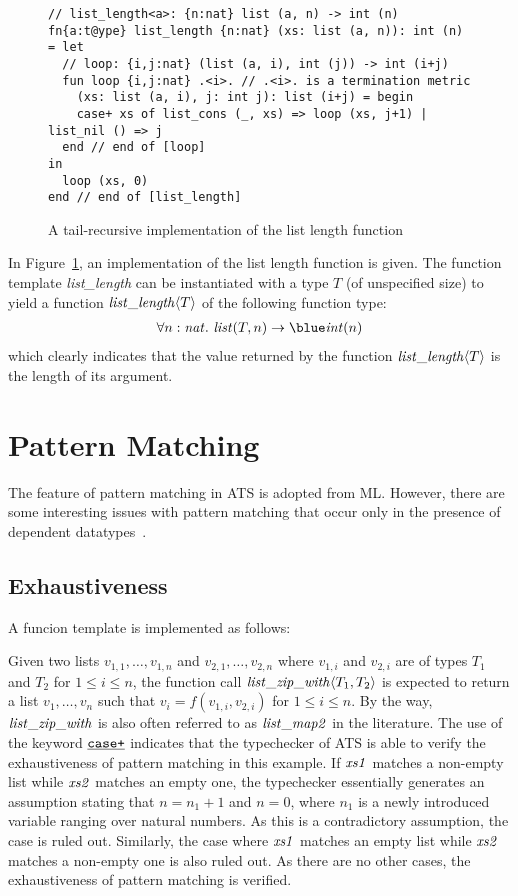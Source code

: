 \begin{figure}[thp]
\begin{verbatim}
// list_length<a>: {n:nat} list (a, n) -> int (n)
fn{a:t@ype} list_length {n:nat} (xs: list (a, n)): int (n) = let
  // loop: {i,j:nat} (list (a, i), int (j)) -> int (i+j)
  fun loop {i,j:nat} .<i>. // .<i>. is a termination metric
    (xs: list (a, i), j: int j): list (i+j) = begin
    case+ xs of list_cons (_, xs) => loop (xs, j+1) | list_nil () => j
  end // end of [loop]
in
  loop (xs, 0)
end // end of [list_length]
\end{verbatim}
\caption{A tail-recursive implementation of the list length function}
\label{figure:list_length_function}
\end{figure}
In Figure~\ref{figure:list_length_function}, an implementation of the list
length function is given. The function template {\it list\_length} can be
instantiated with a type $T$ (of unspecified size) to yield a function
${\it list\_length}\langle T\rangle$ of the following function type:
\[\begin{array}{l}
\forall n:\snat.~\tlist(T, n)\timp \tint(n) \\
\end{array}\]
which clearly indicates that the value returned by the function
${\it list\_length}\langle T\rangle$ is the length of its argument.

\section{Pattern Matching}
The feature of pattern matching in ATS is adopted from ML. However,
there are some interesting issues with pattern matching that occur
only in the presence of dependent datatypes~\cite{DTPM-jucs03}.

\subsection{Exhaustiveness}
A funcion template is implemented as follows:

Given two lists $v_{1,1},\ldots, v_{1,n}$ and $v_{2,1},\ldots, v_{2,n}$
where $v_{1,i}$ and $v_{2,i}$ are of types $T_1$ and $T_2$ for $1\leq i\leq
n$, the function call ${\it list\_zip\_with}\langle T_1,T_2\rangle$ is
expected to return a list $v_1,\ldots,v_n$ such that
$v_i=f(v_{1,i},v_{2,i})$ for $1\leq i\leq n$.  By the way, ${\it
list\_zip\_with}$ is also often referred to as ${\it list\_map2}$ in the
literature.  The use of the keyword $\underline{\texttt{case+}}$ indicates that the
typechecker of ATS is able to verify the exhaustiveness of pattern matching
in this example. If ${\it xs1}$ matches a non-empty list while ${\it xs2}$
matches an empty one, the typechecker essentially generates an assumption
stating that $n=n_1+1$ and $n=0$, where $n_1$ is a newly introduced
variable ranging over natural numbers. As this is a contradictory
assumption, the case is ruled out. Similarly, the case where ${\it xs1}$
matches an empty list while ${\it xs2}$ matches a non-empty one is also
ruled out.  As there are no other cases, the exhaustiveness of pattern
matching is verified.

